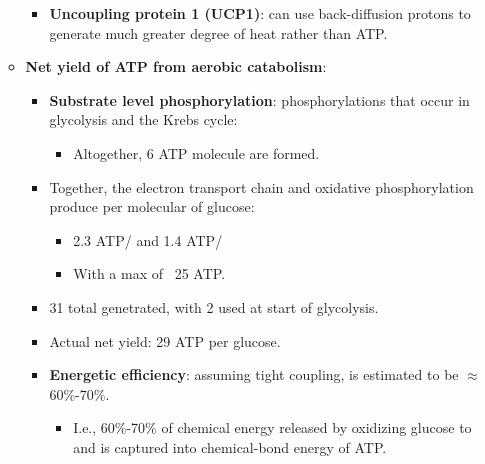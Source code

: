\documentclass[12pt,a4paper]{article}
\begin{document}
\begin{itemize}
\begin{itemize}
\begin{itemize}
\begin{itemize}
                    \end{itemize}
                \item \textbf{Uncoupling protein 1 (UCP1)}: can use back-diffusion protons to generate much greater degree of heat rather than ATP.
            \end{itemize}
        \item \textbf{Net yield of ATP from aerobic catabolism}:
            \begin{itemize}
                \item \textbf{Substrate level phosphorylation}: phosphorylations that occur in glycolysis and the Krebs cycle:
                    \begin{itemize}
                        \item Altogether, 6 ATP molecule are formed.
                    \end{itemize}
                \item Together, the electron transport chain and oxidative phosphorylation produce per molecular of glucose:
                    \begin{itemize}
                        \item 2.3 ATP/ and 1.4 ATP/
                        \item With a max of ~25 ATP.
                    \end{itemize}
                \item 31 total genetrated, with 2 used at start of glycolysis.
                \item Actual {\color{o-Sun}net yield: 29 ATP per glucose}.
                \item \textbf{Energetic efficiency}: assuming tight coupling, is estimated to be \(\approx\)60\%-70\%.
                    \begin{itemize}
                        \item I.e., 60\%-70\% of chemical energy released by oxidizing glucose to  and  is captured into chemical-bond energy of ATP.
                    \end{itemize}
            \end{itemize}
    \end{itemize}

\end{itemize}
\end{document}
